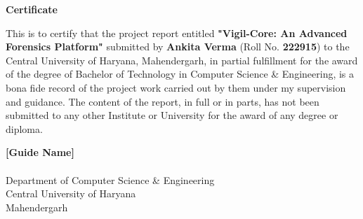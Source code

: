 \begin{center}
\Large{\textbf{Certificate}}
\end{center}
\vspace{1cm}

This is to certify that the project report entitled \textbf{"Vigil-Core: An Advanced Forensics Platform"} submitted by \textbf{Ankita Verma} (Roll No. \textbf{222915}) to the Central University of Haryana, Mahendergarh, in partial fulfillment for the award of the degree of Bachelor of Technology in Computer Science \& Engineering, is a bona fide record of the project work carried out by them under my supervision and guidance. The content of the report, in full or in parts, has not been submitted to any other Institute or University for the award of any degree or diploma.

\vspace{3cm}
\begin{flushright}
\textbf{[Guide Name]}\\
[Guide Designation]\\
Department of Computer Science \& Engineering\\
Central University of Haryana\\
Mahendergarh
\end{flushright}
